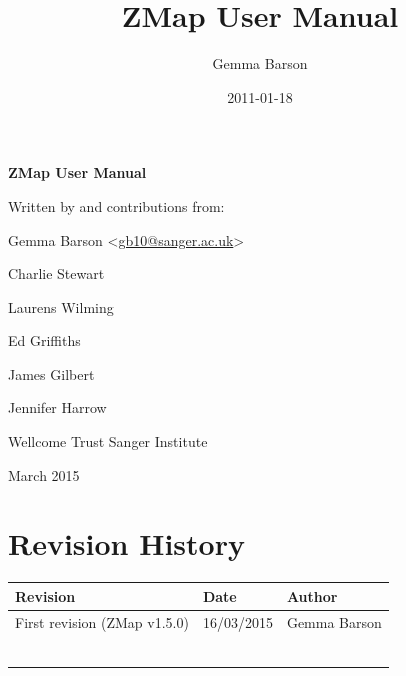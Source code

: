 \documentclass[letterpaper]{article}
\title{ZMap User Manual}
\author{Gemma Barson}
\date{2011-01-18}
\begin{document}
\setcounter{page}{1}\pagestyle{Standard}


\thispagestyle{FirstPage}
{\centering\sffamily\bfseries\color[rgb]{0.0,0.27058825,0.5254902}
\Huge\bf{ZMap User Manual}\par}

\bigskip

{\centering\large{Written by and contributions from:}\par
\large{Gemma Barson} {\textless}\href{mailto:gb10@sanger.ac.uk}{gb10@sanger.ac.uk}{\textgreater}\par
\large{Charlie Stewart}\par
\large{Laurens Wilming}\par
\large{Ed Griffiths}\par
\large{James Gilbert}\par
\large{Jennifer Harrow}\par
}


\bigskip

{\centering\large{Wellcome Trust Sanger Institute}\par}
{ March 2015\par}



\clearpage
{\color[rgb]{0.0,0.27058825,0.5254902}\section[Revision History]{Revision History}}
\hypertarget{RefHeading334316266717}{}

\begin{center}
\tablehead{}
\begin{supertabular}{|m{8.073cm}|m{3.2849998cm}|m{3.282cm}|}
\hline
\bfseries Revision &
\bfseries Date &
\bfseries Author\\\hline
 First revision (ZMap v1.5.0) &
 16/03/2015 &
 Gemma Barson\\\hline
 &
 &
 \\\hline
 &
 &
 \\\hline
 &
 &
 \\\hline
 &
 &
 \\\hline
 &
 &
 \\\hline
 &
 &
 \\\hline
\end{supertabular}
\end{center}

\bigskip

\setcounter{tocdepth}{10}
\renewcommand\contentsname{Contents}
\end{document}
